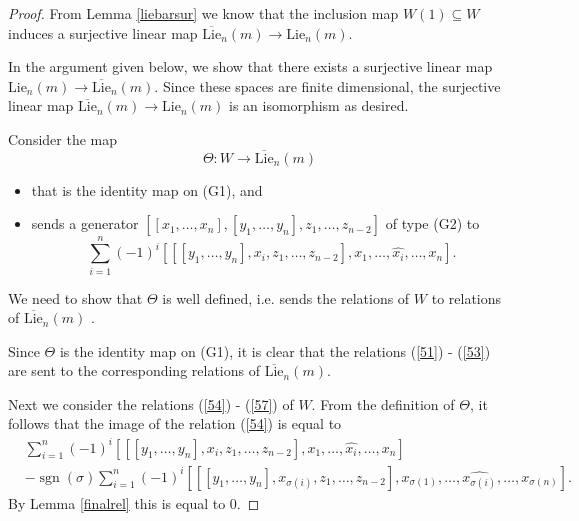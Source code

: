 \documentclass[11pt]{amsart}
\theoremstyle{definition}
\numberwithin{equation}{section}
\DeclareMathOperator{\sign}{sgn}
\begin{document}
\begin{proof}  From Lemma \ref{liebarsur} we know that the inclusion map $W(1) \subseteq W$ induces a surjective linear map  $ \overline{\text{Lie}}_n(m) \to \text{Lie}_n(m).$ 
	
	In the argument given below, we show that there exists a surjective linear map $\text{Lie}_n(m) \to \overline{\text{Lie}}_n(m)$. Since these spaces are finite dimensional, the surjective linear map $\overline{\text{Lie}}_n(m) \to \text{Lie}_n(m)$  is an isomorphism as desired.
	
	Consider the map \[ \Theta:W \to \overline{\text{Lie}}_n(m)\]  \begin{itemize}
		\item that is the identity map on (G1), and
		\item sends a generator $[[{x_1},\dots ,{x_n} ],[{y_{1}},\dots, y_{n}], z_{1},\dots ,z_{n-2}  ]$ of type (G2) to 
		\begin{equation}\label{ThetaG2}\sum_{i=1}^{n}(-1)^{i}[[[y_1,\dots,y_n],x_i , z_1,\dots, z_{n-2}],x_1,\dots,\widehat{x_{i}},\dots, x_n].\end{equation}
	\end{itemize}
	We need to show that $\Theta$ is well defined, i.e. sends the relations  of  $W$ to relations of $\overline{\text{Lie}}_n(m)$ .
	
	Since $\Theta$ is the identity map on (G1), it is clear that the relations (\ref{51}) - (\ref{53})  are sent to the corresponding relations of $\overline{\text{Lie}}_n(m)$.
	
	Next we consider the relations (\ref{54}) - (\ref{57}) of $W$. From the definition of $\Theta$, it follows that the image of the relation (\ref{54}) is equal to 
	\begin{align*}&\sum_{i=1}^n(-1)^i[[[y_1,\dots,y_n],x_i,z_1,\dots, z_{n-2}],x_1,\dots, \widehat{x_i}, \dots, x_n]\\&-\sign(\sigma)\sum_{i=1}^n(-1)^i[[[y_1,\dots,y_n],x_{\sigma(i)},z_1,\dots, z_{n-2}],x_{\sigma(1)},\dots, \widehat{x_{\sigma(i)}}, \dots, x_{\sigma(n)}].
	\end{align*}
	By Lemma \ref{finalrel} this is equal to $0$.
	

\end{proof}
\end{document}
